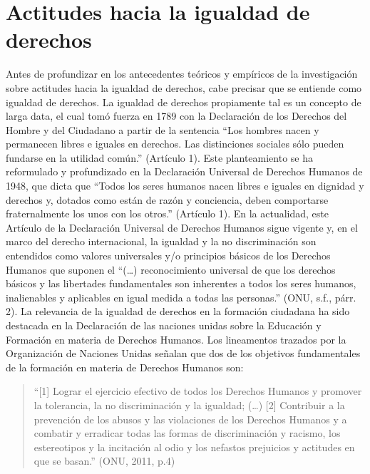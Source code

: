 \documentclass[12pt,twoside]{templates/facsothesis}
\begin{document}
\hypertarget{actitudes-hacia-la-igualdad-de-derechos}{%
\section{Actitudes hacia la igualdad de derechos}\label{actitudes-hacia-la-igualdad-de-derechos}}

Antes de profundizar en los antecedentes teóricos y empíricos de la investigación sobre actitudes hacia la igualdad de derechos, cabe precisar que se entiende como igualdad de derechos. La igualdad de derechos propiamente tal es un concepto de larga data, el cual tomó fuerza en 1789 con la Declaración de los Derechos del Hombre y del Ciudadano a partir de la sentencia ``Los hombres nacen y permanecen libres e iguales en derechos. Las distinciones sociales sólo pueden fundarse en la utilidad común.'' (Artículo 1). Este planteamiento se ha reformulado y profundizado en la Declaración Universal de Derechos Humanos de 1948, que dicta que ``Todos los seres humanos nacen libres e iguales en dignidad y derechos y, dotados como están de razón y conciencia, deben comportarse fraternalmente los unos con los otros.'' (Artículo 1). En la actualidad, este Artículo de la Declaración Universal de Derechos Humanos sigue vigente y, en el marco del derecho internacional, la igualdad y la no discriminación son entendidos como valores universales y/o principios básicos de los Derechos Humanos que suponen el ``(\ldots) reconocimiento universal de que los derechos básicos y las libertades fundamentales son inherentes a todos los seres humanos, inalienables y aplicables en igual medida a todas las personas.'' (ONU, s.f., párr. 2). La relevancia de la igualdad de derechos en la formación ciudadana ha sido destacada en la Declaración de las naciones unidas sobre la Educación y Formación en materia de Derechos Humanos. Los lineamentos trazados por la Organización de Naciones Unidas señalan que dos de los objetivos fundamentales de la formación en materia de Derechos Humanos son:

\begin{quote}
``{[}1{]} Lograr el ejercicio efectivo de todos los Derechos Humanos y promover la tolerancia, la no discriminación y la igualdad; (\ldots) {[}2{]} Contribuir a la prevención de los abusos y las violaciones de los Derechos Humanos y a combatir y erradicar todas las formas de discriminación y racismo, los estereotipos y la incitación al odio y los nefastos prejuicios y actitudes en que se basan.'' (ONU, 2011, p.4)
\end{quote}
\end{document}
